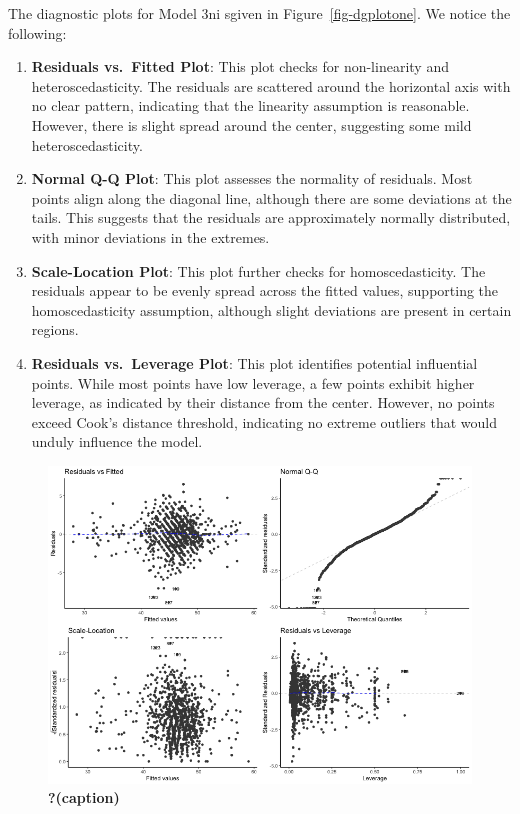 \documentclass[
  letterpaper,
  DIV=11,
  numbers=noendperiod]{scrartcl}
\begin{document}
The diagnostic plots for Model 3ni sgiven in Figure~\ref{fig-dgplotone}.
We notice the following:

\begin{enumerate}
\def\labelenumi{\arabic{enumi}.}
\item
  \textbf{Residuals vs.~Fitted Plot}: This plot checks for non-linearity
  and heteroscedasticity. The residuals are scattered around the
  horizontal axis with no clear pattern, indicating that the linearity
  assumption is reasonable. However, there is slight spread around the
  center, suggesting some mild heteroscedasticity.
\item
  \textbf{Normal Q-Q Plot}: This plot assesses the normality of
  residuals. Most points align along the diagonal line, although there
  are some deviations at the tails. This suggests that the residuals are
  approximately normally distributed, with minor deviations in the
  extremes.
\item
  \textbf{Scale-Location Plot}: This plot further checks for
  homoscedasticity. The residuals appear to be evenly spread across the
  fitted values, supporting the homoscedasticity assumption, although
  slight deviations are present in certain regions.
\item
  \textbf{Residuals vs.~Leverage Plot}: This plot identifies potential
  influential points. While most points have low leverage, a few points
  exhibit higher leverage, as indicated by their distance from the
  center. However, no points exceed Cook's distance threshold,
  indicating no extreme outliers that would unduly influence the model.
\end{enumerate}

\begin{figure}

{\centering \includegraphics{../other/graphs/diagnostic_plot_model6.png}

}

\caption{\label{fig-dgplottwo}\textbf{?(caption)}}

\end{figure}
\end{document}
